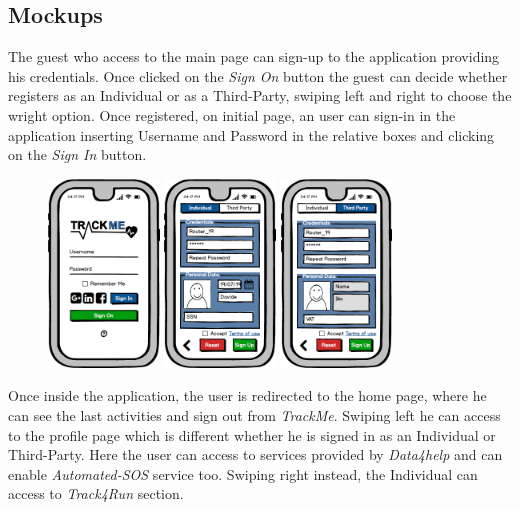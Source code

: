 \documentclass[a4paper]{article}
\begin{document}
\subsection{Mockups}
The guest who access to the main page can sign-up to the application providing his credentials. Once clicked on the \textit{Sign On} button the guest can decide whether registers as an Individual or as a Third-Party, swiping left and right to choose the wright option. Once registered, on initial page, an user can sign-in in the application inserting Username and Password in the relative boxes and clicking on the \textit{Sign In} button. 

\begin{figure}[!htpb]
    	\centering
    	\includegraphics[height=50mm]{images/mockups/Login_Registration.png}
    	\includegraphics[height=50mm]{images/mockups/RegistrationForm.png}
    	\includegraphics[height=50mm]{images/mockups/ThirdPartyRegistration.png}
        \end{figure}

Once inside the application, the user is redirected to the home page, where he can see the last activities and sign out from \textit{TrackMe}. Swiping left he can access to the profile page which is different whether he is signed in as an Individual or Third-Party. Here the user can access to services provided by \textit{Data4help} and can enable \textit{Automated-SOS} service too. Swiping right instead, the Individual can access to \textit{Track4Run} section.
\end{document}
